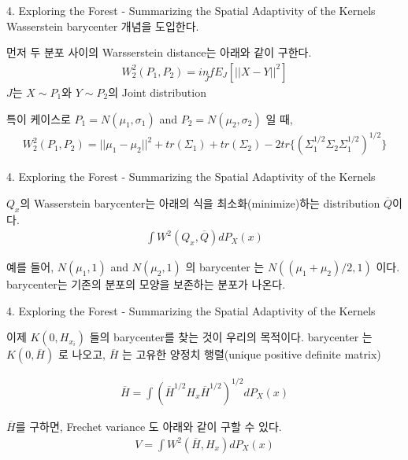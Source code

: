 \documentclass[mathserif]{beamer}
\begin{document}
\begin{frame}{4. Exploring the Forest - Summarizing the Spatial Adaptivity of the Kernels}
Wasserstein barycenter 개념을 도입한다.

먼저 두 분포 사이의 Warsserstein distance는 아래와 같이 구한다.
\begin{align*}
    W_2^2(P_1,P_2) = \underset{J}{inf}E_J[||X-Y||^2]
\end{align*}
$J$는 $X \sim P_1$와 $Y \sim P_2$의 Joint distribution

특이 케이스로 $P_1 = N(\mu_1,\sigma_1)$ and $P_2 = N(\mu_2,\sigma_2)$ 일 때,
\begin{align*}
    W_2^2(P_1,P_2) = ||\mu_1-\mu_2||^2 + tr(\Sigma_1) + tr(\Sigma_2) -2tr\Big\{(\Sigma_1^{1/2}\Sigma_2\Sigma_1^{1/2})^{1/2}\Big\}
\end{align*}
\end{frame}

\begin{frame}{4. Exploring the Forest - Summarizing the Spatial Adaptivity of the Kernels}

$Q_x$의 Wasserstein barycenter는 아래의 식을 최소화(minimize)하는 distribution $\overline{Q}$이다.
\begin{align*}
    \int W^2(Q_x,\overline{Q})dP_X(x)
\end{align*}

예를 들어, $N(\mu_1,1)$ and $N(\mu_2,1)$ 의 barycenter 는 $N((\mu_1+\mu_2)/2,1)$ 이다. barycenter는 기존의 분포의 모양을 보존하는 분포가 나온다.
\end{frame}


\begin{frame}{4. Exploring the Forest - Summarizing the Spatial Adaptivity of the Kernels}

이제 $K(0,H_{x_i})$ 들의 barycenter를 찾는 것이 우리의 목적이다.
barycenter 는 $K(0,\overline{H})$ 로 나오고, $\overline{H}$ 는 고유한 양정치 행렬(unique positive definite matrix)

\begin{align}
    \overline{H} = \int (\overline{H}^{1/2}H_x\overline{H}^{1/2})^{1/2}dP_X(x)
\end{align}

$\overline{H}$를 구하면, Frechet variance 도 아래와 같이 구할 수 있다.
\begin{align}
    V = \int W^2(\overline{H},H_x)dP_X(x)
\end{align}

\end{frame}
\end{document}
